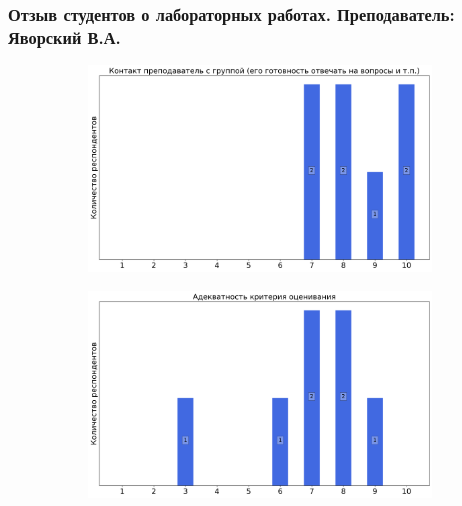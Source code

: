     
    \subsubsection{Отзыв студентов о лабораторных работах. Преподаватель: Яворский В.А.}
        \begin{figure}[H]
            \centering
            \begin{subfigure}[b]{0.45\textwidth}
                \centering
                \includegraphics[width=\textwidth]{images/1 course/Общая физика - механика/labniks-marks-Яворский В.А.-0.png}
            \end{subfigure}
            \begin{subfigure}[b]{0.45\textwidth}
                \centering
                \includegraphics[width=\textwidth]{images/1 course/Общая физика - механика/labniks-marks-Яворский В.А.-1.png}
            \end{subfigure}
            \begin{subfigure}[b]{0.45\textwidth}
                \centering

\end{subfigure}
\end{figure}
